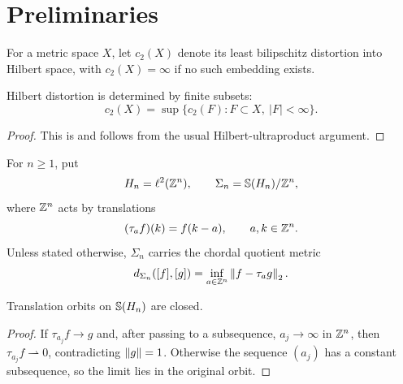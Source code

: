\section{Preliminaries}

\begin{definition}\label{def:hilbert-distortion}
\leanok
For a metric space $X$, let $c_2(X)$ denote its least bilipschitz distortion
into Hilbert space, with $c_2(X)=\infty$ if no such embedding exists.
\end{definition}

\begin{proposition}\label{prop:finite-determination}
\leanok
{}
Hilbert distortion is determined by finite subsets:
\begin{equation}\label{eq:finite-determination}
        c_2(X)=\sup\{c_2(F):F\subset X,\ |F|<\infty\}.
\end{equation}
\end{proposition}

\begin{proof}
This is \cite[Proposition~31]{CahillIversonMixon} and follows from the usual
Hilbert-ultraproduct argument.
\end{proof}

\begin{definition}
\label{def:higher-rank-sphere-quotient}
\leanok
For $n\ge1$, put
\[
        H_n=\ell^2(\mathbb Z^n),
        \qquad
        \Sigma_n=\mathbb S(H_n)/\mathbb Z^n,
\]
where $\mathbb Z^n$ acts by translations
\[
        (\tau_a f)(k)=f(k-a),\qquad a,k\in\mathbb Z^n.
\]
Unless stated otherwise, $\Sigma_n$ carries the chordal quotient metric
\[
        d_{\Sigma_n}([f],[g])=\inf_{a\in\mathbb Z^n}\left\lVert f-\tau_a g\right\rVert_2.
\]
\end{definition}

\begin{lemma}\label{lem:higher-rank-orbits-closed}
\leanok
{}
Translation orbits on $\mathbb S(H_n)$ are closed.
\end{lemma}

\begin{proof}
If $\tau_{a_j}f\to g$ and, after passing to a subsequence, $a_j\to\infty$ in
$\mathbb Z^n$, then $\tau_{a_j}f\rightharpoonup0$, contradicting $\left\lVert g\right\rVert=1$.
Otherwise the sequence $(a_j)$ has a constant subsequence, so the limit lies in
the original orbit.
\end{proof}

